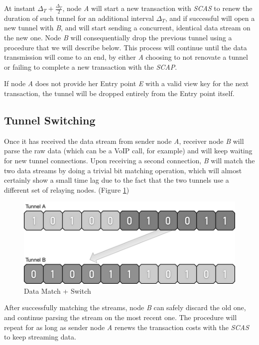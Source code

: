 At instant \(\Delta_T + \frac{\Delta_T}{2}\), node \emph{A} will start a
new transaction with \emph{SCAS} to renew the duration of such tunnel
for an additional interval \(\Delta_T\), and if successful will open a
new tunnel with \emph{B}, and will start sending a concurrent, identical
data stream on the new one. Node \emph{B} will consequentially drop the
previous tunnel using a procedure that we will describe below. This
process will continue until the data transmission will
come to an end, by either \emph{A} choosing to not renovate a tunnel or
failing to complete a new transaction with the \emph{SCAP}.

If node \emph{A} does not provide her Entry point \emph{E} with a valid
view key for the next transaction, the tunnel will be dropped entirely
from the Entry point itself.

\subsection{Tunnel Switching}

Once it has received the data stream from sender node \emph{A}, receiver node
\emph{B} will parse the raw data (which can be a VoIP call, for example)
and will keep waiting for new tunnel connections. Upon receiving a
second connection, \emph{B} will match the two data streams by doing a
trivial bit matching operation, which will almost certainly show a small
time lag due to the fact that the two tunnels use a different set of
relaying nodes. (Figure \ref{datamatch})

\begin{figure}
\includegraphics[scale=0.5]{dataswitch}
\caption{Data Match + Switch}
\label{datamatch}
\end{figure}

After successfully matching the streams, node \emph{B} can safely
discard the old one, and continue parsing the stream on the most recent
one. The procedure will repeat for as long as sender node \emph{A}
renews the transaction costs with the \emph{SCAS} to keep streaming data.

